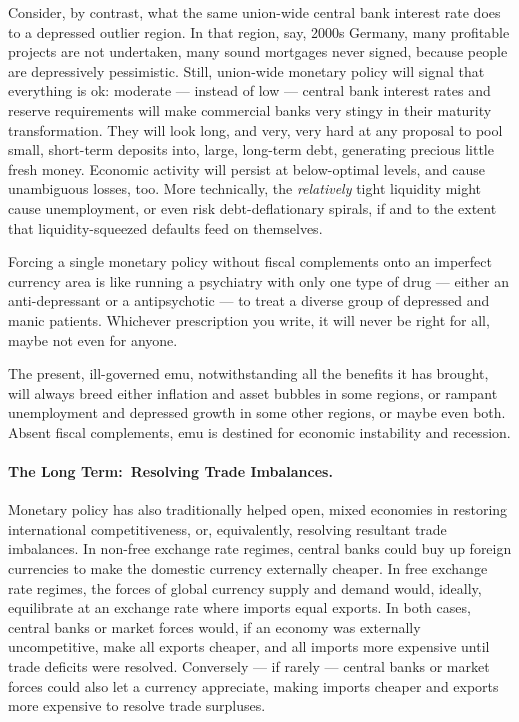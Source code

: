 Consider, by contrast, what the same union-wide central bank interest rate does to a depressed outlier region.
In that region, say, 2000s Germany, many profitable projects are not undertaken, many sound mortgages never signed, because people are depressively pessimistic.
Still, union-wide monetary policy will signal that everything is ok:
moderate --- instead of low --- central bank interest rates and reserve requirements will make commercial banks very stingy in their maturity transformation.
They will look long, and very, very hard at any proposal to pool small, short-term deposits into, large, long-term debt, generating precious little fresh money.
Economic activity will persist at below-optimal levels, and cause unambiguous losses, too.
More technically, the \emph{relatively} tight liquidity might cause unemployment, or even risk debt-deflationary spirals, if and to the extent that liquidity-squeezed defaults feed on themselves.

Forcing a single monetary policy without fiscal complements onto an imperfect currency area is like running a psychiatry with only one type of drug --- either an anti-depressant or a antipsychotic --- to treat a diverse group of depressed and manic patients.
Whichever prescription you write, it will never be right for all, maybe not even for anyone.

The present, ill-governed \gls{emu}, notwithstanding all the benefits it has brought, will always breed either inflation and asset bubbles in some regions, or rampant unemployment and depressed growth in some other regions, or maybe even both.
Absent fiscal complements, \gls{emu} is destined for economic instability and recession.

\paragraph[Long Term]{The Long Term:~Resolving Trade Imbalances.} Monetary policy has also traditionally helped open, mixed economies in restoring international competitiveness, or, equivalently, resolving resultant trade imbalances.
In non-free exchange rate regimes, central banks could buy up foreign currencies to make the domestic currency externally cheaper.
In free exchange rate regimes, the forces of global currency supply and demand would, ideally, equilibrate at an exchange rate where imports equal exports.
In both cases, central banks or market forces would, if an economy was externally uncompetitive, make all exports cheaper, and all imports more expensive until trade deficits were resolved.
Conversely --- if rarely --- central banks or market forces could also let a currency appreciate, making imports cheaper and exports more expensive to resolve trade surpluses.

